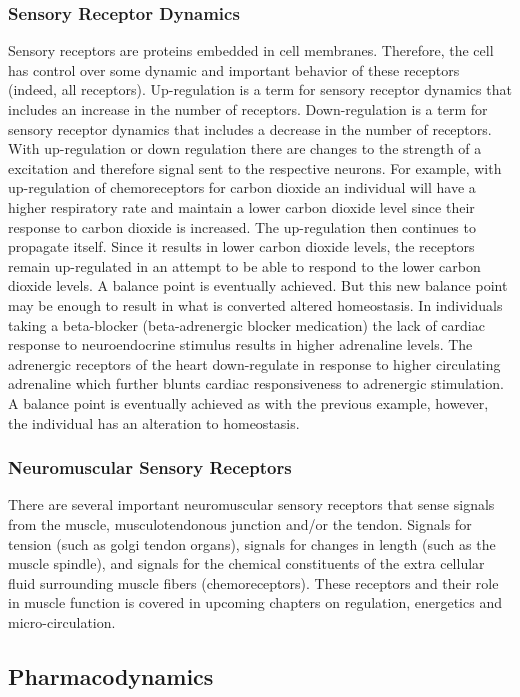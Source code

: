 \subsubsection{Sensory Receptor Dynamics}
Sensory receptors are proteins embedded in cell membranes. Therefore, the cell has control over some dynamic and important behavior of these receptors (indeed, all receptors).  Up-regulation is a term for sensory receptor dynamics that includes an increase in the number of receptors. Down-regulation is a term for sensory receptor dynamics that includes a decrease in the number of receptors. With up-regulation or down regulation there are changes to the strength of a excitation and therefore signal sent to the respective neurons. For example, with up-regulation of chemoreceptors for carbon dioxide an individual will have a higher respiratory rate and maintain a lower carbon dioxide level since their response to carbon dioxide is increased. The up-regulation then continues to propagate itself. Since it results in lower carbon dioxide levels, the receptors remain up-regulated in an attempt to be able to respond to the lower carbon dioxide levels. A balance point is eventually achieved. But this new balance point may be enough to result in what is converted altered homeostasis. In individuals taking a beta-blocker (beta-adrenergic blocker medication) the lack of cardiac response to neuroendocrine stimulus results in higher adrenaline levels. The adrenergic receptors of the heart down-regulate in response to higher circulating adrenaline which further blunts cardiac responsiveness to adrenergic stimulation. A balance point is eventually achieved as with the previous example, however, the individual has an alteration to homeostasis. 

\subsubsection{Neuromuscular Sensory Receptors} 
There are several important neuromuscular sensory receptors that sense signals from the muscle, musculotendonous junction and/or the tendon. Signals for tension (such as golgi tendon organs), signals for changes in length (such as the muscle spindle), and signals for the chemical constituents of the extra cellular fluid surrounding muscle fibers (chemoreceptors). These receptors and their role in muscle function is covered in upcoming chapters on regulation, energetics and micro-circulation.

\subsection{Pharmacodynamics}

